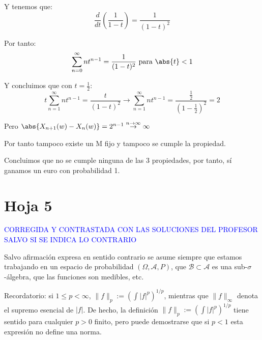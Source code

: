 \begin{problem}[6]
\begin{enumerate}
Y tenemos que:
\[
\frac{d}{dt}(\frac{1}{1-t})=\frac{1}{(1-t)^2}
\]

Por tanto:
\[
\sum_{n=0}^{\infty} nt^{n-1} = \frac{1}{(1-t)^2} \text{ para } \abs{t}<1
\]

Y concluimos que con $t=\frac{1}{2}$:
\[
t \sum_{n=1}^{\infty}nt^{n-1}=\frac{t}{(1-t)^2} \rightarrow \sum_{n=1}^{\infty}nt^{n-1} = \frac{\frac{1}{2}}{(1-\frac{1}{2})^2}=2
\]

Pero $\abs{X_{n+1}(w)-X_n(w)} = 2^{n-1}  \stackrel{n \rightarrow \infty}{\rightarrow} \infty$

Por tanto tampoco existe un M fijo y tampoco se cumple la propiedad.
\end{enumerate}

Concluimos que no se cumple ninguna de las 3 propiedades, por tanto, sí ganamos un euro con probabilidad 1.
\end{problem}


\newpage
\section{Hoja 5}

\textcolor{blue}{CORREGIDA Y CONTRASTADA CON LAS SOLUCIONES DEL PROFESOR SALVO SI SE INDICA LO CONTRARIO}

Salvo afirmaci\'on expresa en sentido
contrario se asume siempre que estamos trabajando en un espacio de probabilidad $(\Omega, \mathcal{A}, P)$,
que  $\mathcal{B}\subset \mathcal{A}$ es una sub-$\sigma$-\'algebra, que las funciones son medibles, etc.


Recordatorio: si $1\le p < \infty$, $\|f\|_p := \left(\int|f|^p\right)^{1/p}$, mientras que
$\|f\|_\infty$ denota el supremo esencial de $|f|$. De hecho, la definici\'on
 $\|f\|_p := \left(\int|f|^p\right)^{1/p}$ tiene sentido para cualquier $p > 0$ finito, pero puede
demostrarse que si $p < 1$ esta expresi\'on no define una norma.

